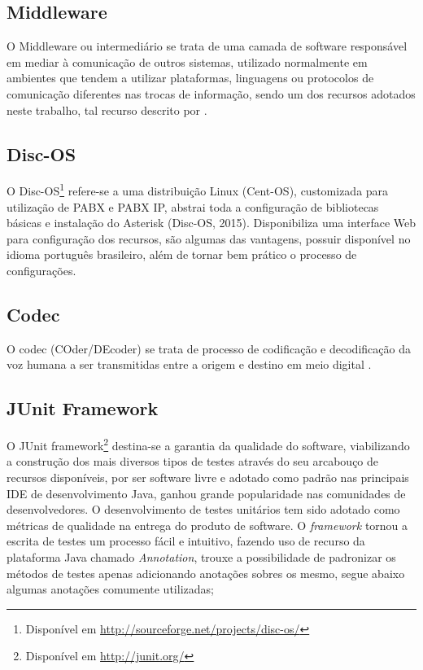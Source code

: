\subsection{Middleware}
O Middleware ou intermediário se trata de uma camada de software responsável em mediar à comunicação de outros sistemas, utilizado normalmente em ambientes que tendem a utilizar plataformas, linguagens ou protocolos de comunicação diferentes nas trocas de informação, sendo um dos recursos adotados neste trabalho, tal recurso descrito por .

\subsection{Disc-OS}
O Disc-OS\footnote{Disponível em \url{http://sourceforge.net/projects/disc-os/}}\label{key:DISC-OS} refere-se a uma distribuição Linux (Cent-OS), customizada para utilização de PABX e PABX IP, abstrai toda a configuração de bibliotecas básicas e instalação do Asterisk (Disc-OS, 2015). Disponibiliza uma interface Web para configuração dos recursos, são algumas das vantagens, possuir disponível no idioma português brasileiro, além de tornar bem prático o processo de configurações.

\subsection{Codec}
O codec (COder/DEcoder) se trata de processo de codificação e decodificação da voz humana a ser transmitidas entre a origem e destino em meio digital \cite{VIEIRA:2007}.

\subsection{JUnit Framework}
O JUnit framework\footnote{Disponível em \url{http://junit.org/}} destina-se a garantia da qualidade do software, viabilizando a construção dos mais diversos tipos de testes através 
do seu arcabouço de recursos disponíveis, por ser software livre e adotado como padrão nas principais IDE de desenvolvimento Java, ganhou grande popularidade nas comunidades de desenvolvedores. O desenvolvimento de testes unitários tem sido adotado como métricas de qualidade na entrega do produto de software.
O \textit{framework} tornou a escrita de testes um processo fácil e intuitivo, fazendo uso de recurso da plataforma Java chamado \textit{Annotation}\label{key:annotation}, trouxe a possibilidade de padronizar os métodos de testes apenas adicionando anotações sobres os mesmo, segue abaixo algumas anotações comumente utilizadas;

